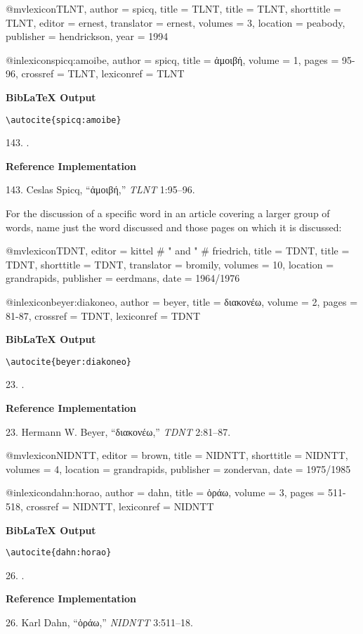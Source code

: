 \documentclass[a4paper]{article}
\newcommand{\gr}[1]{{\greekfont #1}}
\newcommand\citetestlex[2]{%
  {\textbf{BibLaTeX Output}\par
   \nobreak
   \texttt{\textbackslash autocite\{#2\}}\par
   \color{biblatex-colour}
   #1. \cite{#2}.\par}}
\newenvironment{refimp}{%
  \begin{minipage}{\linewidth}
    \setlength{\parskip}{1ex}
    \textbf{Reference Implementation}\par
    \nobreak
    \color{reference-colour}
}{\end{minipage}}
\newenvironment{vb}{%
  \setlength{\parskip}{0pt}
  \verbatim}{\endverbatim}
\begin{document}
\begin{vb}
@mvlexicon{TLNT,
  author = spicq,
  title = TLNT,
  title = TLNT,
  shorttitle = {TLNT},
  editor = ernest,
  translator = ernest,
  volumes = {3},
  location = peabody,
  publisher = hendrickson,
  year = {1994}
}

@inlexicon{spicq:amoibe,
  author = spicq,
  title = {\gr{ἀμοιβή}},
  volume = {1},
  pages = {95-96},
  crossref = {TLNT},
  lexiconref = {TLNT}
}
\end{vb}

\citetestlex{143}{spicq:amoibe}

\begin{refimp}
  143. Ceslas Spicq, “\gr{ἀμοιβή},” \emph{TLNT} 1:95–96.
\end{refimp}

\bigskip

For the discussion of a specific word in an article covering a larger group of
words, name just the word discussed and those pages on which it is discussed:

\begin{vb}
@mvlexicon{TDNT,
  editor = kittel # " and " # friedrich,
  title = TDNT,
  title = TDNT,
  shorttitle = {TDNT},
  translator = bromily,
  volumes = {10},
  location = grandrapids,
  publisher = eerdmans,
  date = {1964/1976}
}

@inlexicon{beyer:diakoneo,
  author = beyer,
  title = {\gr{διακονέω}},
  volume = {2},
  pages = {81-87},
  crossref = {TDNT},
  lexiconref = {TDNT}
}
\end{vb}

\citetestlex{23}{beyer:diakoneo}

\begin{refimp}
  23. Hermann W. Beyer, “\gr{διακονέω},” \emph{TDNT} 2:81–87.
\end{refimp}

\begin{vb}
@mvlexicon{NIDNTT,
  editor = brown,
  title = NIDNTT,
  shorttitle = {NIDNTT},
  volumes = {4},
  location = grandrapids,
  publisher = zondervan,
  date = {1975/1985}
}

@inlexicon{dahn:horao,
  author = dahn,
  title = {\gr{ὁράω}},
  volume = {3},
  pages = {511-518},
  crossref = {NIDNTT},
  lexiconref = {NIDNTT}
}
\end{vb}

\citetestlex{26}{dahn:horao}

\begin{refimp}
  26. Karl Dahn, “\gr{ὁράω},” \emph{NIDNTT} 3:511–18.
\end{refimp}
\end{document}
